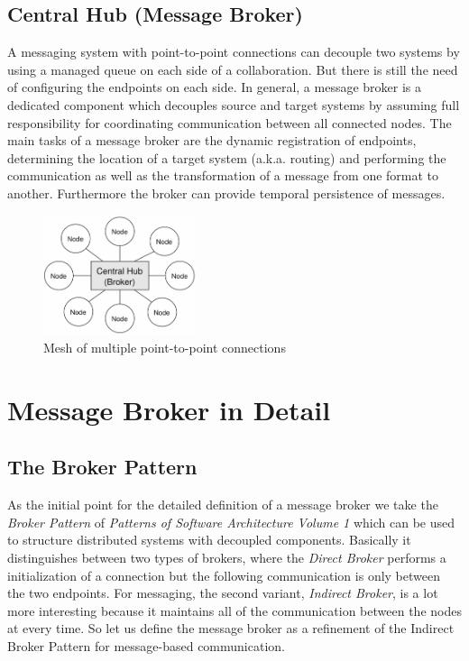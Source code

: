 \subsection{Central Hub (Message Broker)}
\label{intro-messaging-broker}
A messaging system with point-to-point connections can decouple two systems
by using a managed queue on each side of a collaboration. But there is
still the need of configuring the endpoints on each side. In general, a
message broker is a dedicated component which decouples source and
target systems by assuming full responsibility for coordinating communication between
all connected nodes. The main tasks of a message broker are the
dynamic registration of endpoints, determining the location of a target system
(a.k.a. routing) and performing the communication as well as the transformation of a
message from one format to another. Furthermore the broker can provide temporal
persistence of messages. \cite{MSDNIntegration} \\

\begin{figure}[H]
    \centering
    \includegraphics[width=0.4\textwidth]{images/central-hub.png}
    \caption{Mesh of multiple point-to-point connections}
    \label{fig:central-hub}
\end{figure}


\section{Message Broker in Detail}
\subsection{The Broker Pattern }
As the initial point for the detailed definition of a message broker we take the
\textit{Broker Pattern} of  \textit{Patterns of Software Architecture Volume 1}
which can be used to structure distributed systems with decoupled components.
Basically it distinguishes between two types of brokers, where the \textit{Direct
Broker} performs a initialization of a connection but the following communication
is only between the two endpoints. For messaging, the second variant,
\textit{Indirect Broker}, is a lot more interesting because it maintains all of
the communication between the nodes at every time. So let us define the message
broker as a refinement of the Indirect Broker Pattern for message-based
communication.\cite{POSA1} 

